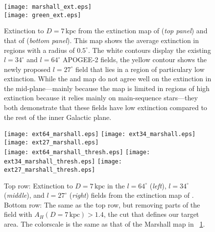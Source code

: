 \documentclass[12pt,preprint]{aastex}
\begin{document}
\begin{figure}[t!]
\begin{center}
\texttt{[image: marshall\_ext.eps]}\\
\texttt{[image: green\_ext.eps]}
\end{center}
\caption{Extinction to $D=7\,\mathrm{kpc}$ from the extinction map of
  \citet{Marshall06a} (\emph{top panel}) and that of \citet{Green15a}
  (\emph{bottom panel}). This map shows the average extinction in
  regions with a radius of $0.5^\circ$. The white contours display the
  existing $l=34^\circ$ and $l=64^\circ$ APOGEE-2 fields, the yellow
  contour shows the newly proposed $l=27^\circ$ field that lies in a
  region of particulary low extinction. While the \citet{Marshall06a}
  and \citet{Green15a} map do not agree well on the extinction in the
  mid-plane---mainly because the \citet{Green15a} map is limited in
  regions of high extinction because it relies mainly on main-sequence
  stars---they both demonstrate that these fields have low extinction
  compared to the rest of the inner Galactic plane.}\label{fig:ext}
\end{figure}

\begin{figure}[t!]
\begin{center}
\texttt{[image: ext64\_marshall.eps]}
\texttt{[image: ext34\_marshall.eps]}
\texttt{[image: ext27\_marshall.eps]}\\
\texttt{[image: ext64\_marshall\_thresh.eps]}
\texttt{[image: ext34\_marshall\_thresh.eps]}
\texttt{[image: ext27\_marshall\_thresh.eps]}
\end{center}
\caption{Top row: Extinction to $D=7\,\mathrm{kpc}$ in the
  $l=64^\circ$ (\emph{left}), $l=34^\circ$ (\emph{middle}), and
  $l=27^\circ$ (\emph{right}) fields from the extinction map of
  \citet{Marshall06a}. Bottom row: The same as the top row, but
  removing parts of the field with $A_H(D=7\,\mathrm{kpc}) > 1.4$, the
  cut that defines our target area. The colorscale is the same as that
  of the Marshall map in
  \figurename~\ref{fig:ext}.}\label{fig:extfield}
\end{figure}
\end{document}
